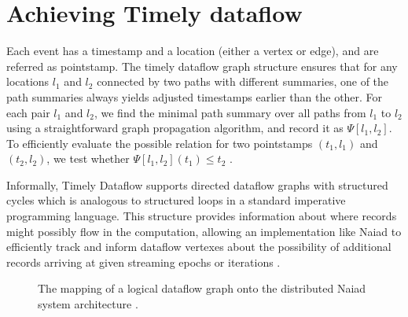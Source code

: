 \documentclass[9pt,twocolumn,twoside]{../../styles/osajnl}
\begin{document}
\section{Achieving Timely dataflow}
Each event has a timestamp and a location (either a vertex or edge),
and are referred as pointstamp. The timely dataflow graph structure
ensures that for any locations $l_1$ and $l_2$ connected by two paths
with different summaries, one of the path summaries always yields
adjusted timestamps earlier than the other. For each pair $l_1$ and
$l_2$, we find the minimal path summary over all paths from $l_1$ to
$l_2$ using a straightforward graph propagation algorithm, and record
it as $\Psi[l_1, l_2]$. To efficiently evaluate the possible relation
for two pointstamps $(t_1, l_1)$ and $(t_2, l_2)$, we test whether
$\Psi[l_1, l_2](t_1) \le t_2$ \cite{paper1-Naiad}.

Informally, Timely Dataflow supports directed dataflow graphs with
structured cycles which is analogous to structured loops in a standard
imperative programming language. This structure provides information
about where records might possibly flow in the computation, allowing
an implementation like Naiad to efficiently track and inform dataflow
vertexes about the possibility of additional records arriving at given
streaming epochs or iterations \cite{www-naiad}.

\begin{figure}[htbp]
\centering
{}
\caption{The mapping of a logical dataflow graph onto the distributed
  Naiad system architecture \cite{paper1-Naiad}.}
\label{Naiad-LDF}
\end{figure}
\end{document}
